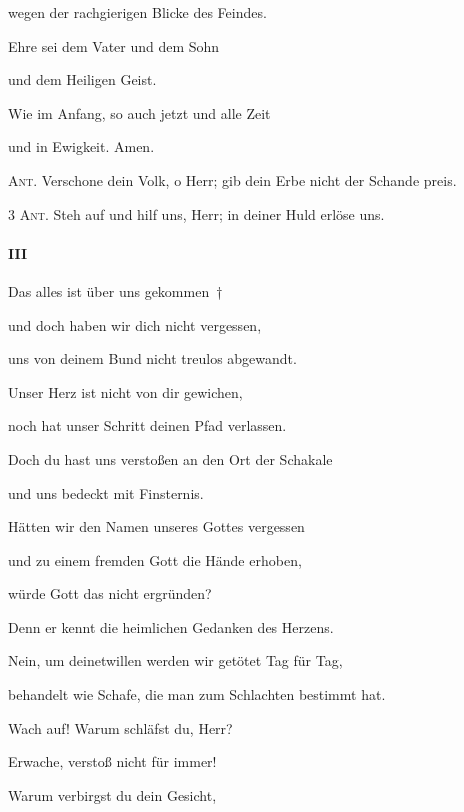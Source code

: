 wegen der rachgierigen Blicke des Feindes.

\noindent Ehre sei dem Vater und dem Sohn~\GreStar{}~\nopagebreak

und dem Heiligen Geist.

\noindent Wie im Anfang, so auch jetzt und alle Zeit~\GreStar{}~\nopagebreak

und in Ewigkeit. Amen.

\vspace{10pt}

\noindent \textsc{Ant.} Verschone dein Volk, o Herr; gib dein Erbe nicht der Schande preis. \vspace{10pt}

\noindent \textsc{3 Ant.} Steh auf und hilf uns, Herr; in deiner Huld erlöse uns.

\paragraph{III}

\noindent Das alles ist über uns gekommen~†~\nopagebreak

und doch haben wir dich nicht vergessen,~\GreStar{}~\nopagebreak

uns von deinem Bund nicht treulos abgewandt.

\noindent Unser Herz ist nicht von dir gewichen,~\GreStar{}~\nopagebreak

noch hat unser Schritt deinen Pfad verlassen.

\noindent Doch du hast uns verstoßen an den Ort der Schakale~\GreStar{}~\nopagebreak

und uns bedeckt mit Finsternis.

\noindent Hätten wir den Namen unseres Gottes vergessen~\GreStar{}~\nopagebreak

und zu einem fremden Gott die Hände erhoben,

\noindent würde Gott das nicht ergründen?~\GreStar{}~\nopagebreak

Denn er kennt die heimlichen Gedanken des Herzens.

\noindent Nein, um deinetwillen werden wir getötet Tag für Tag,~\GreStar{}~\nopagebreak

behandelt wie Schafe, die man zum Schlachten bestimmt hat. 

 \noindent Wach auf! Warum schläfst du, Herr?~\GreStar{}~\nopagebreak

Erwache, verstoß nicht für immer! 

 \noindent Warum verbirgst du dein Gesicht,~\GreStar{}~\nopagebreak

